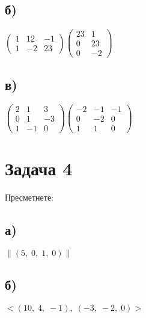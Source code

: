 \documentclass[12pt]{article}
\begin{document}
\subsection*{б)}

$\begin{pmatrix}
    1 & 12 & -1 \\
    1 & -2 & 23
\end{pmatrix}\begin{pmatrix}
    23 & 1 \\
    0 & 23 \\
    0 & -2
\end{pmatrix}$

\subsection*{в)}

$\begin{pmatrix}
    2 & 1 & 3 \\
    0 & 1 & -3 \\
    1 & -1 & 0
\end{pmatrix} \begin{pmatrix}
    -2 & -1 & -1 \\
    0 & -2 & 0 \\
    1 & 1 & 0
\end{pmatrix}$

\section*{Задача 4}

Пресметнете:

\subsection*{а)}

$\|(5, \; 0, \; 1, \; 0)\|$

\subsection*{б)}

$<(10, \; 4, \; -1), \; (-3, \; -2, \; 0)>$
\end{document}
